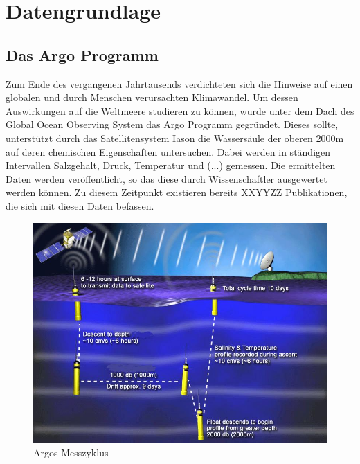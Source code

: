  \section{Datengrundlage}
    
    

    \subsection{Das Argo Programm}
    
    
    Zum Ende des vergangenen Jahrtausends verdichteten sich die Hinweise auf einen globalen und durch Menschen verursachten Klimawandel. Um dessen Auswirkungen auf die Weltmeere studieren zu können, wurde unter dem Dach des Global Ocean Observing System das Argo Programm gegründet. Dieses sollte, unterstützt durch das Satellitensystem Iason die Wassersäule der oberen 2000m auf deren chemischen Eigenschaften untersuchen. Dabei werden in ständigen Intervallen Salzgehalt, Druck, Temperatur und (...) gemessen. Die ermittelten Daten werden veröffentlicht, so das diese durch Wissenschaftler ausgewertet werden können. Zu diesem Zeitpunkt existieren bereits XXYYZZ Publikationen, die sich mit diesen Daten befassen.
    
    
    \begin{figure}[h]
        \centering
        \includegraphics{pix/operation_park_profile.jpg}
        \caption[Argos Messzyklus - Bildquelle: http://www.argo.ucsd.edu]{Argos  Messzyklus}
        \label{fig:Argo-messzyklus}
    \end{figure}

